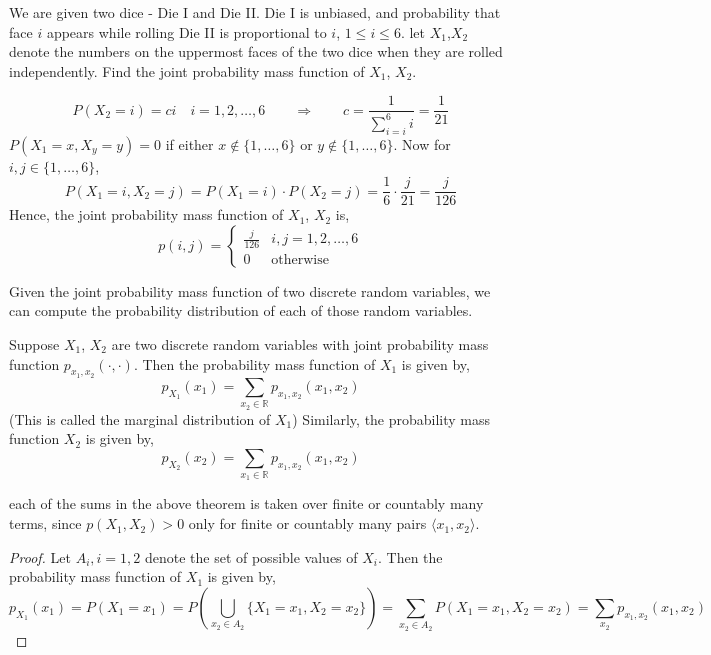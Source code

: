 \begin{example}
We are given two dice - Die I and Die II. Die I is unbiased, and probability
that face $i$ appears while rolling Die II is proportional to $i$, $1 \leq i
\leq 6$. let $X_1$,$X_2$ denote the numbers on the uppermost faces of the two
dice when they are rolled independently. Find the joint probability mass
function of $X_1$, $X_2$.
\end{example}
\begin{solution}
\[
    P(X_2 = i) = ci \quad i = 1, 2, \dots, 6
    \qquad \Rightarrow \qquad
    c= \frac{1}{\sum_{i = i}^6 i} = \frac{1}{21}
\]
$P(X_1 = x, X_y = y) = 0$ if either $x \notin \lbrace 1, \dots, 6 \rbrace$ or
$y \notin \lbrace 1, \dots, 6 \rbrace$. Now for $i, j \in \lbrace 1,
\dots, 6 \rbrace$, 
\[
    P(X_1 = i, X_2 = j) = P(X_1 = i) \cdot P(X_2 = j)
                        = \frac{1}{6} \cdot \frac{j}{21}
                        = \frac{j}{126}
\]
Hence, the joint probability mass function of $X_1$, $X_2$ is,
\[
    p(i, j) = \begin{cases}
        \frac{j}{126}            & i,j = 1, 2, \dots, 6                      \\
        0                        & \text{otherwise}
    \end{cases}
\]
\end{solution}

Given the joint probability mass function of two discrete random variables, we
can compute the probability distribution of each of those random variables.  
\begin{theorem}
Suppose $X_1$, $X_2$ are two discrete random variables with joint probability
mass function $p_{x_1, x_2}(\cdot, \cdot)$. Then the probability mass function
of $X_1$ is given by,
\[
    p_{X_1}(x_1) = \sum_{x_2 \in \mathbb{R}} p_{x_1,x_2}(x_1, x_2)
\]
(This is called the marginal distribution of $X_1$) Similarly, the probability
mass function $X_2$ is given by,
\[
    p_{X_2}(x_2) = \sum_{x_1 \in \mathbb{R}} p_{x_1,x_2}(x_1, x_2)
\]
\end{theorem}
\note each of the sums in the above theorem is taken over finite or countably
many terms, since $p(X_1, X_2) > 0$ only for finite or countably many pairs
$\langle x_1, x_2 \rangle$.
\begin{proof}
Let $A_i, i = 1, 2$ denote the set of possible values of $X_i$. Then the
probability mass function of $X_1$ is given by,
\[
    p_{X_1}(x_1) = P(X_1 = x_1)
                 = P \left(
                       \bigcup_{x_2 \in A_2} 
                       \lbrace X_1 = x_1, X_2 = x_2 \rbrace
                   \right)
                 = \sum_{x_2 \in A_2} P(X_1 = x_1, X_2 = x_2)
                 = \sum_{x_2} p_{x_1, x_2}(x_1, x_2)
\]
\end{proof}

